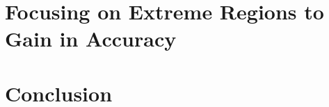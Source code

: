 \documentclass{ecsthesis}      %
\begin{document}
\part{Focusing on Extreme Regions to Gain in Accuracy}\label{part:vect}



\part*{Conclusion}\label{chap:concl}


\appendix
%
%
\backmatter


%
\end{document}
